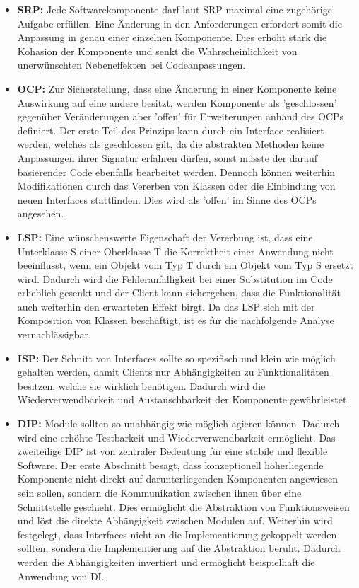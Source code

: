 \begin{itemize}[]
	\item \textbf{\acrlong{SRP}: } {Jede Softwarekomponente darf laut SRP maximal eine zugehörige Aufgabe erfüllen. Eine Änderung in den Anforderungen erfordert somit die Anpassung in genau einer einzelnen Komponente. Dies erhöht stark die \Gls{Kohasion} der Komponente und senkt die Wahrscheinlichkeit von unerwünschten Nebeneffekten bei Codeanpassungen.}
	\item \textbf{\acrlong{OCP}: } {Zur Sicherstellung, dass eine Änderung in einer Komponente keine Auswirkung auf eine andere besitzt, werden Komponente als 'geschlossen' gegenüber Veränderungen aber 'offen' für Erweiterungen anhand des OCPs definiert. Der erste Teil des Prinzips kann durch ein Interface realisiert werden, welches als geschlossen gilt, da die abstrakten Methoden keine Anpassungen ihrer Signatur erfahren dürfen, sonst müsste der darauf basierender Code ebenfalls bearbeitet werden. Dennoch können weiterhin Modifikationen durch das Vererben von Klassen oder die Einbindung von neuen Interfaces stattfinden. Dies wird als 'offen' im Sinne des OCPs angesehen.}
	\item \textbf{\acrlong{LSP}: } {Eine wünschenswerte Eigenschaft der Vererbung ist, dass eine Unterklasse S einer Oberklasse T die Korrektheit einer Anwendung nicht beeinflusst, wenn ein Objekt vom Typ T durch ein Objekt vom Typ S ersetzt wird. Dadurch wird die Fehleranfälligkeit bei einer Substitution im Code erheblich gesenkt und der Client kann sichergehen, dass die Funktionalität auch weiterhin den erwarteten Effekt birgt. Da das LSP sich mit der Komposition von Klassen beschäftigt, ist es für die nachfolgende Analyse vernachlässigbar.}
	\item \textbf{\acrlong{ISP}: } {Der Schnitt von Interfaces sollte so spezifisch und klein wie möglich gehalten werden, damit Clients nur Abhängigkeiten zu Funktionalitäten besitzen, welche sie wirklich benötigen. Dadurch wird die Wiederverwendbarkeit und Austauschbarkeit der Komponente gewährleistet.}
	\item \textbf{\acrlong{DIP}: } {Module sollten so unabhängig wie möglich agieren können. Dadurch wird eine erhöhte Testbarkeit und Wiederverwendbarkeit ermöglicht. Das zweiteilige DIP ist von zentraler Bedeutung für eine stabile und flexible Software. Der erste Abschnitt besagt, dass konzeptionell höherliegende Komponente nicht direkt auf darunterliegenden Komponenten angewiesen sein sollen, sondern die Kommunikation zwischen ihnen über eine Schnittstelle geschieht. Dies ermöglicht die Abstraktion von Funktionsweisen und löst die direkte Abhängigkeit zwischen Modulen auf. Weiterhin wird festgelegt, dass Interfaces nicht an die Implementierung gekoppelt werden sollten, sondern die Implementierung auf die Abstraktion beruht. Dadurch werden die Abhängigkeiten invertiert und ermöglicht beispielhaft die Anwendung von \Gls{DI}.}
\end{itemize}

